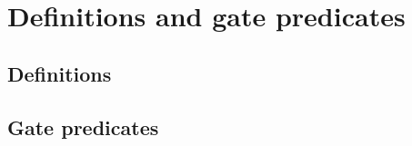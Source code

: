 \section{Definitions and gate predicates}\label{app:definitions}


\subsection{Definitions}\label{subsec:definitions-list}

\begin{description}
\end{description}

\subsection{Gate predicates}\label{subsec:gate-predicates-list}

\begin{description}
\end{description}
